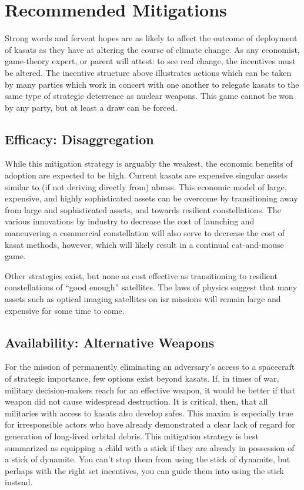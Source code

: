 \section*{Recommended Mitigations}

Strong words and fervent hopes are as likely to affect the outcome of
deployment of \acp{kasat} as they have at altering the course of
climate change.  As any economist, game-theory expert, or parent will
attest: to see real change, the incentives must be altered.  The
incentive structure above illustrates actions which can be taken by
many parties which work in concert with one another to relegate
\acp{kasat} to the same type of strategic deterrence as nuclear
weapons.  This game cannot be won by any party, but at least a draw
can be forced.


\subsection*{Efficacy: Disaggregation}
While this mitigation strategy is arguably the weakest, the economic
benefits of adoption are expected to be high.  Current \acp{kasat} are
expensive singular assets similar to (if not deriving directly from)
\acp{abms}.  This economic model of large, expensive, and highly
sophisticated assets can be overcome by transitioning away from large
and sophisticated assets, and towards resilient constellations.  The
various innovations by industry to decrease the cost of launching and
maneuvering a commercial constellation will also serve to decrease the
cost of \ac{kasat} methods, however, which will likely result in a
continual cat-and-mouse game.

Other strategies exist, but none as cost effective as transitioning to
resilient constellations of ``good enough'' satellites.  The laws of
physics suggest that many assets such as optical imaging satellites on
\ac{isr} missions will remain large and expensive for some time to
come.

\subsection*{Availability: Alternative Weapons}
For the mission of permanently eliminating an adversary's access to a
spacecraft of strategic importance, few options exist beyond
\acp{kasat}.  If, in times of war, military decision-makers reach for
an effective weapon, it would be better if that weapon did not cause
widespread destruction.  It is critical, then, that all militaries
with access to \acp{kasat} also develop \acp{safe}.  This maxim is
especially true for irresponsible actors who have already demonstrated
a clear lack of regard for generation of long-lived orbital debris.
This mitigation strategy is best summarized as equipping a child with
a stick if they are already in possession of a stick of dynamite.  You
can't stop them from using the stick of dynamite, but perhaps with the
right set incentives, you can guide them into using the stick instead.

